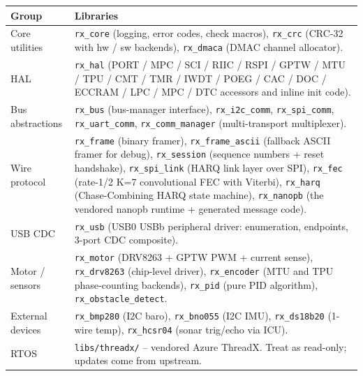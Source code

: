 \begin{center}
\begin{tabular}{|p{2.6cm}|p{12.0cm}|}
\hline
\textbf{Group}     & \textbf{Libraries}                                                                                                                                                                                                              \\
\hline
Core utilities     & \texttt{rx\_core} (logging, error codes, check macros), \texttt{rx\_crc} (CRC-32 with hw / sw backends), \texttt{rx\_dmaca} (DMAC channel allocator).                                                                            \\
HAL                & \texttt{rx\_hal} (PORT / MPC / SCI / RIIC / RSPI / GPTW / MTU / TPU / CMT / TMR / IWDT / POEG / CAC / DOC / ECCRAM / LPC / MPC / DTC accessors and inline init code).                                                            \\
Bus abstractions   & \texttt{rx\_bus} (bus-manager interface), \texttt{rx\_i2c\_comm}, \texttt{rx\_spi\_comm}, \texttt{rx\_uart\_comm}, \texttt{rx\_comm\_manager} (multi-transport multiplexer).                                                       \\
Wire protocol      & \texttt{rx\_frame} (binary framer), \texttt{rx\_frame\_ascii} (fallback ASCII framer for debug), \texttt{rx\_session} (sequence numbers + reset handshake), \texttt{rx\_spi\_link} (HARQ link layer over SPI), \texttt{rx\_fec} (rate-1/2 K=7 convolutional FEC with Viterbi), \texttt{rx\_harq} (Chase-Combining HARQ state machine), \texttt{rx\_nanopb} (the vendored nanopb runtime + generated message code). \\
USB CDC            & \texttt{rx\_usb} (USB0 USBb peripheral driver: enumeration, endpoints, 3-port CDC composite).                                                                                                                                  \\
Motor / sensors    & \texttt{rx\_motor} (DRV8263 + GPTW PWM + current sense), \texttt{rx\_drv8263} (chip-level driver), \texttt{rx\_encoder} (MTU and TPU phase-counting backends), \texttt{rx\_pid} (pure PID algorithm), \texttt{rx\_obstacle\_detect}. \\
External devices   & \texttt{rx\_bmp280} (I2C baro), \texttt{rx\_bno055} (I2C IMU), \texttt{rx\_ds18b20} (1-wire temp), \texttt{rx\_hcsr04} (sonar trig/echo via ICU).                                                                                  \\
RTOS               & \texttt{libs/threadx/} -- vendored Azure ThreadX. Treat as read-only; updates come from upstream.                                                                                                                                \\
\hline
\end{tabular}
\end{center}

